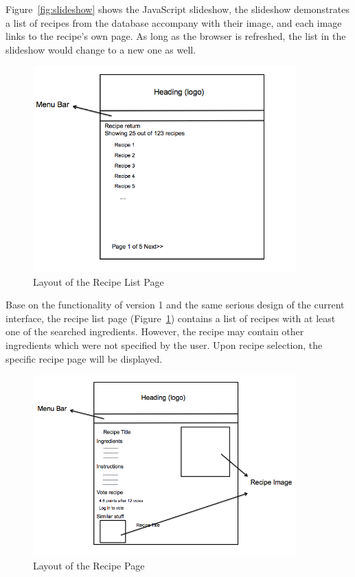 Figure~\ref{fig:slideshow} shows the JavaScript slideshow, the slideshow demonstrates a list of recipes from the database accompany with their image, and each image links to the recipe's own page. As long as the browser is refreshed, the list in the slideshow would change to a new one as well. 

\begin{figure}[H]
\begin{center}
\includegraphics[width=0.9\textwidth]{result_list_v2}
\caption{Layout of the Recipe List Page}
\label{fig:recipe_list_v2}
\end{center}
\end{figure}

Base on the functionality of version 1 and the same serious design of the current interface, the recipe list page (Figure~\ref{fig:recipe_list_v2}) contains a list of recipes with at least one of the searched ingredients. However, the recipe may contain other ingredients which were not specified by the user. Upon recipe selection, the specific recipe page will be displayed.

\begin{figure}[H]
\begin{center}
\includegraphics[width=0.9\textwidth]{recipe_page_v2}
\caption{Layout of the Recipe Page}
\label{fig:recipe_page}
\end{center}
\end{figure}

